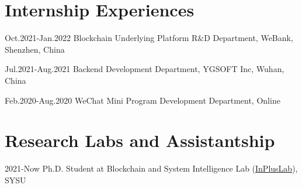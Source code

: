 \documentclass[12pt,letterpaper]{report}
\newcommand{\listitemspace}{0.25em}
\renewenvironment{itemize}
{\begin{list}{}{\setlength{\leftmargin}{0em}
                \setlength{\parskip}{0em}
                \setlength{\itemsep}{\listitemspace}
                \setlength{\parsep}{\listitemspace}}}
{\end{list}}
\begin{document}
    \section*{Internship Experiences}
    \begin{tablist}
        \item[Oct.2021-Jan.2022] \tab{}Blockchain Underlying Platform R\&D Department, WeBank, Shenzhen, China
        \item[Jul.2021-Aug.2021] \tab{}Backend Development Department, YGSOFT Inc, Wuhan, China
        \item[Feb.2020-Aug.2020] \tab{}WeChat Mini Program Development Department, Online 
    \end{tablist}


    \section*{Research Labs and Assistantship}
    \begin{tablist}
        \item[2021-Now] \tab{}Ph.D. Student at Blockchain and System Intelligence Lab (\href{http://www.inpluslab.com}{InPlusLab}), SYSU
    \end{tablist}

\end{document}
